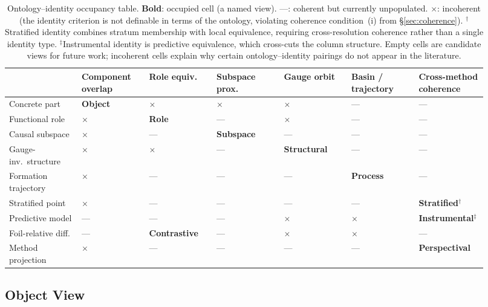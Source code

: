 \documentclass{article}
\begin{document}
\begin{table}[H]
\centering
\small
\setlength{\tabcolsep}{3pt}
\begin{tabular}{p{0.14\linewidth}p{0.13\linewidth}p{0.13\linewidth}p{0.13\linewidth}p{0.13\linewidth}p{0.13\linewidth}p{0.13\linewidth}}
\toprule
& \textbf{Component overlap} & \textbf{Role equiv.} & \textbf{Subspace prox.} & \textbf{Gauge orbit} & \textbf{Basin / trajectory} & \textbf{Cross-method coherence} \\
\midrule
Concrete part
  & \textbf{Object} & $\times$ & $\times$ & $\times$ & --- & --- \\[2pt]
Functional role
  & $\times$ & \textbf{Role} & --- & $\times$ & --- & --- \\[2pt]
Causal subspace
  & $\times$ & --- & \textbf{Subspace} & --- & --- & --- \\[2pt]
Gauge-inv.\ structure
  & $\times$ & $\times$ & --- & \textbf{Structural} & --- & --- \\[2pt]
Formation trajectory
  & $\times$ & --- & --- & --- & \textbf{Process} & --- \\[2pt]
Stratified point
  & $\times$ & --- & --- & --- & --- & \textbf{Stratified}$^\dagger$ \\[2pt]
Predictive model
  & --- & --- & --- & $\times$ & $\times$ & \textbf{Instrumental}$^\ddagger$ \\[2pt]
Foil-relative diff.
  & --- & \textbf{Contrastive} & --- & $\times$ & $\times$ & --- \\[2pt]
Method projection
  & $\times$ & --- & --- & --- & --- & \textbf{Perspectival} \\
\bottomrule
\end{tabular}
\caption{Ontology--identity occupancy table.  \textbf{Bold}: occupied cell (a named view).  ---: coherent but currently unpopulated.  $\times$: incoherent (the identity criterion is not definable in terms of the ontology, violating coherence condition~(i) from \S\ref{sec:coherence}).  $^\dagger$Stratified identity combines stratum membership with local equivalence, requiring cross-resolution coherence rather than a single identity type.  $^\ddagger$Instrumental identity is predictive equivalence, which cross-cuts the column structure.  Empty cells are candidate views for future work; incoherent cells explain why certain ontology--identity pairings do not appear in the literature.}
\label{tab:occupancy}
\end{table}


\subsection{Object View}
\end{document}
